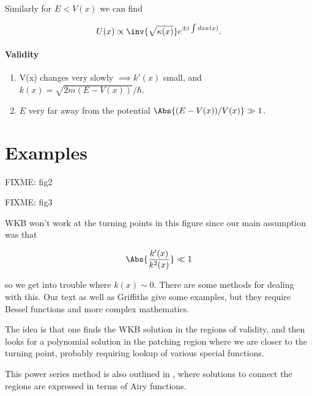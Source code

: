 Similarly for $E < V(x)$ we can find

\begin{equation}\label{eqn:qmTwoL12:370}
U(x) \propto \inv{\sqrt{\kappa(x)}} e^{\pm i \int dx \kappa(x)}.
\end{equation}

\paragraph{Validity}
\begin{enumerate}
\item V(x) changes very slowly $\implies k'(x)$ small, and $k(x) = \sqrt{2 m (E - V(x))}/\hbar$.
\item $E$ very far away from the potential $\Abs{(E - V(x))/V(x)} \gg 1$.
\end{enumerate}

\section{Examples}

FIXME: fig2

FIXME: fig3

WKB won't work at the turning points in this figure since our main assumption was that

\begin{equation}\label{eqn:qmTwoL12:390}
\Abs{\frac{k'(x)}{k^2(x)}} \ll 1
\end{equation}

so we get into trouble where $k(x) \sim 0$.  There are some methods for dealing with this.  Our text as well as Griffiths give some examples, but they require Bessel functions and more complex mathematics.

The idea is that one finds the WKB solution in the regions of validity, and then looks for a polynomial solution in the patching region where we are closer to the turning point, probably requiring lookup of various special functions.

This power series method is also outlined in \cite{wiki:wkb}, where solutions to connect the regions are expressed in terms of Airy functions.

\EndArticle
